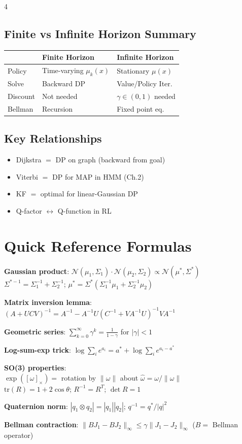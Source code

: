 \documentclass[8pt,landscape]{article}
\begin{document}
\begin{multicols}{4}
\subsection{Finite vs Infinite Horizon Summary}
\begin{tabular}{@{}lll@{}}
\toprule
 & Finite Horizon & Infinite Horizon\\
\midrule
Policy & Time-varying $\mu_k(x)$ & Stationary $\mu(x)$\\
Solve & Backward DP & Value/Policy Iter.\\
Discount & Not needed & $\gamma\in(0,1)$ needed\\
Bellman & Recursion & Fixed point eq.\\
\bottomrule
\end{tabular}

\subsection{Key Relationships}
\begin{itemize}
  \item Dijkstra $=$ DP on graph (backward from goal)
  \item Viterbi $=$ DP for MAP in HMM (Ch.2)
  \item KF $=$ optimal for linear-Gaussian DP
  \item Q-factor $\leftrightarrow$ Q-function in RL
\end{itemize}

\section{Quick Reference Formulas}

\textbf{Gaussian product}: $\mathcal{N}(\mu_1,\Sigma_1)\cdot\mathcal{N}(\mu_2,\Sigma_2)\propto\mathcal{N}(\mu^*,\Sigma^*)$\\
$\Sigma^{*-1}=\Sigma_1^{-1}+\Sigma_2^{-1}$; $\mu^*=\Sigma^*(\Sigma_1^{-1}\mu_1+\Sigma_2^{-1}\mu_2)$

\textbf{Matrix inversion lemma}:
$(A+UCV)^{-1}=A^{-1}-A^{-1}U(C^{-1}+VA^{-1}U)^{-1}VA^{-1}$

\textbf{Geometric series}: $\sum_{k=0}^\infty\gamma^k=\frac{1}{1-\gamma}$ for $|\gamma|<1$

\textbf{Log-sum-exp trick}: $\log\sum_i e^{a_i}=a^*+\log\sum_i e^{a_i-a^*}$

\textbf{SO(3) properties}:\\
$\exp([\omega]_\times)=$ rotation by $\|\omega\|$ about $\hat\omega=\omega/\|\omega\|$\\
$\text{tr}(R)=1+2\cos\theta$; $R^{-1}=R^T$; $\det R=1$

\textbf{Quaternion norm}: $|q_1\otimes q_2|=|q_1||q_2|$; $q^{-1}=q^*/|q|^2$

\textbf{Bellman contraction}: $\|BJ_1-BJ_2\|_\infty\le\gamma\|J_1-J_2\|_\infty$ ($B=$ Bellman operator)

\end{multicols}
\end{document}
